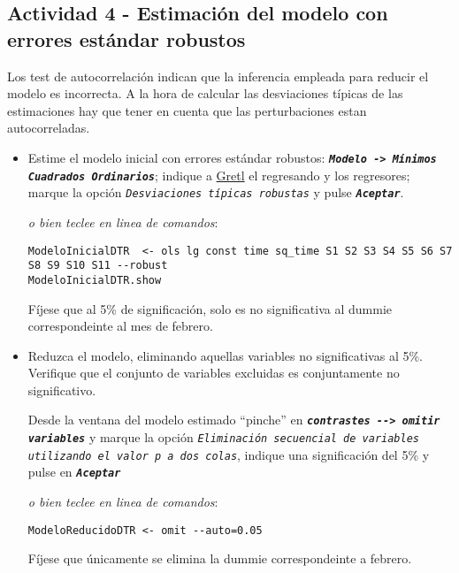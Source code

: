\documentclass[11pt]{article}
\begin{document}
\subsection{Actividad 4 - Estimación del modelo con errores estándar robustos}
\label{sec:org6e22af7}

Los test de autocorrelación indican que la inferencia empleada para
reducir el modelo es incorrecta. A la hora de calcular las
desviaciones típicas de las estimaciones hay que tener en cuenta que
las perturbaciones estan autocorreladas.

\begin{itemize}
\item Estime el modelo inicial con errores estándar robustos: \textbf{\emph{\texttt{Modelo ->
  Mínimos Cuadrados Ordinarios}}}; indique a \href{https://gretl.sourceforge.net/es.html}{Gretl} el regresando y los
regresores; marque la opción \emph{\texttt{Desviaciones típicas robustas}} y
pulse \textbf{\emph{\texttt{Aceptar}}}.

{\vspace{1pt} \footnotesize \color{gray!70!black} \color{gray!70!black}
\emph{o bien teclee en linea de comandos}:
\begin{verbatim}
ModeloInicialDTR  <- ols lg const time sq_time S1 S2 S3 S4 S5 S6 S7 S8 S9 S10 S11 --robust
ModeloInicialDTR.show
\end{verbatim}
}

Fíjese que al 5\% de significación, solo es no significativa al
dummie correspondeinte al mes de febrero.

\item Reduzca el modelo, eliminando aquellas variables no significativas
al 5\%. Verifique que el conjunto de variables excluidas es
conjuntamente no significativo.

Desde la ventana del modelo estimado ``pinche'' en \textbf{\emph{\texttt{contrastes -{}-{}>
  omitir variables}}} y marque la opción \emph{\texttt{Eliminación secuencial de
  variables utilizando el valor p a dos colas}}, indique una
significación del 5\% y pulse en \textbf{\emph{\texttt{Aceptar}}}
{\vspace{0pt} \footnotesize \color{gray!70!black}
\emph{o bien teclee en linea de comandos}:
\begin{verbatim}
ModeloReducidoDTR <- omit --auto=0.05
\end{verbatim}
}

Fíjese que únicamente se elimina la dummie correspondeinte a
febrero.
\end{itemize}
\end{document}
